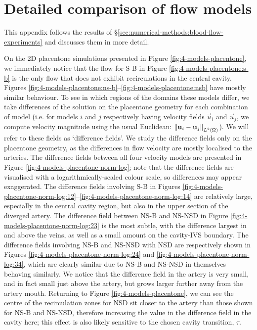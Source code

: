 \chapter{Detailed comparison of flow models} \label{sec:flow-comparison}
    This appendix follows the results of \S\ref{sec:numerical-methods:blood-flow-experiments} and discusses them in more detail.

    On the 2D placentone simulations presented in Figure \ref{fig:4-models-placentone}, we immediately notice that the flow for S-B in Figure \ref{fig:4-models-placentone:s-b} is the only flow that does not exhibit recirculations in the central cavity. Figures \ref{fig:4-models-placentone:ns-b}--\ref{fig:4-models-placentone:nsb} have mostly similar behaviour. To see in which regions of the domains these models differ, we take differences of the solution on the placentone geometry for each combination of model (i.e. for models $i$ and $j$ respectively having velocity fields $\vec{u}_i$ and $\vec{u}_j$, we compute velocity magnitude using the usual Euclidean: $\norm{\boldsymbol{\mathbf{u}}_i - \boldsymbol{\mathbf{u}}_j}_{L^2(\Omega)}$). We will refer to these fields as `difference fields'. We study the difference fields only on the placentone geometry, as the differences in flow velocity are mostly localised to the arteries. The difference fields between all four velocity models are presented in Figure \ref{fig:4-models-placentone-norm-log}; note that the difference fields are visualised with a logarithmically-scaled colour scale, so differences may appear exaggerated. The difference fields involving S-B in Figures \ref{fig:4-models-placentone-norm-log:12}--\ref{fig:4-models-placentone-norm-log:14} are relatively large, especially in the central cavity region, but also in the upper section of the diverged artery. The difference field between NS-B and NS-NSD in Figure \ref{fig:4-models-placentone-norm-log:23} is the most subtle, with the difference largest in and above the veins, as well as a small amount on the cavity-IVS boundary. The difference fields involving NS-B and NS-NSD with NSD are respectively shown in Figures \ref{fig:4-models-placentone-norm-log:24} and \ref{fig:4-models-placentone-norm-log:34}, which are clearly similar due to NS-B and NS-NSD in themselves behaving similarly. We notice that the difference field in the artery is very small, and in fact small just above the artery, but grows larger further away from the artery mouth. Returning to Figure \ref{fig:4-models-placentone}, we can see the centre of the recirculation zones for NSD sit closer to the artery than those shown for NS-B and NS-NSD, therefore increasing the value in the difference field in the cavity here; this effect is also likely sensitive to the chosen cavity transition, $\tau$.

